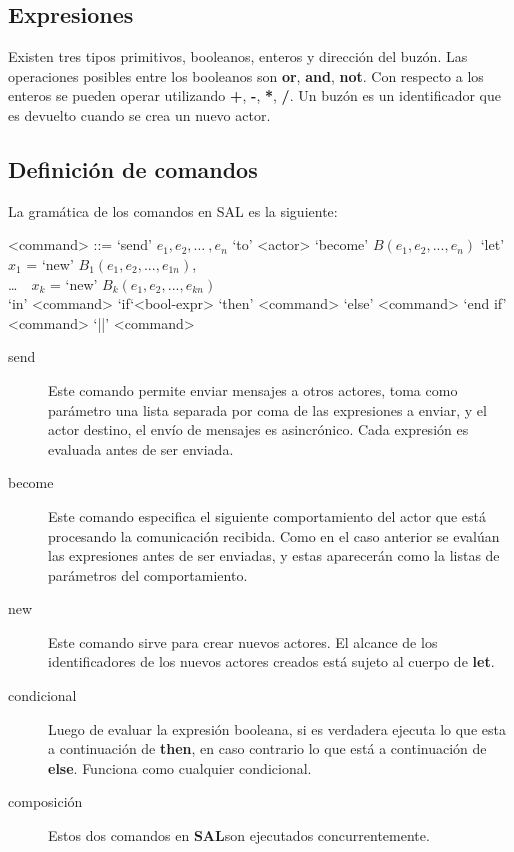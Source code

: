 \documentclass[fleqn]{article}
\newcommand{\SAL}{\textbf{SAL}}
\begin{document}
\subsection{Expresiones}
Existen tres tipos primitivos, booleanos, enteros y dirección del buzón. Las operaciones
posibles entre los booleanos son \textbf{or}, \textbf{and}, \textbf{not}. Con
respecto a los enteros se pueden operar utilizando \textbf{+}, \textbf{-},
\textbf{*}, \textbf{/}. Un buzón es un identificador que es devuelto cuando se
crea un nuevo actor.

\subsection{Definición de comandos}
La gramática de los comandos en SAL es la siguiente:

\begin{grammar}
  <command> ::= `send' $e_1, e_2, \ldots\ , e_n$ `to' <actor>  
  \alt `become' $B(e_1, e_2, ..., e_n)$
  \alt `let' $x_1$ = `new' $B_1(e_1, e_2, ..., e_{1n})$, \\
   \ldots\ \ $x_k$ = `new' $B_k(e_1, e_2, ..., e_{kn})$       \\
  `in' <command> 
  \alt `if`<bool-expr> `then' <command> `else' <command> `end if'
  \alt <command> `||' <command>
\end{grammar}

\begin{description}
\item [send]  Este comando permite enviar mensajes a otros actores, toma como
  parámetro una lista separada por coma de las expresiones a enviar, y el actor
  destino, el envío de mensajes es asincrónico. Cada expresión es evaluada antes
  de ser enviada.
\item [become] Este comando especifica el siguiente comportamiento del actor
  que está procesando la comunicación recibida. Como en el caso anterior se evalúan
  las expresiones antes de ser enviadas, y estas aparecerán como la listas de
  parámetros del comportamiento. 
\item[new] Este comando sirve para crear nuevos actores. El alcance de los
  identificadores de los nuevos actores creados está sujeto al cuerpo de \textbf{let}.
\item[condicional] Luego de evaluar la expresión booleana, si es verdadera
  ejecuta lo que esta a continuación de \textbf{then}, en caso contrario lo que está a
  continuación de \textbf{else}. Funciona como cualquier condicional.
\item[composición] Estos dos comandos en \SAL son ejecutados concurrentemente.
 
\end{description}
\end{document}
